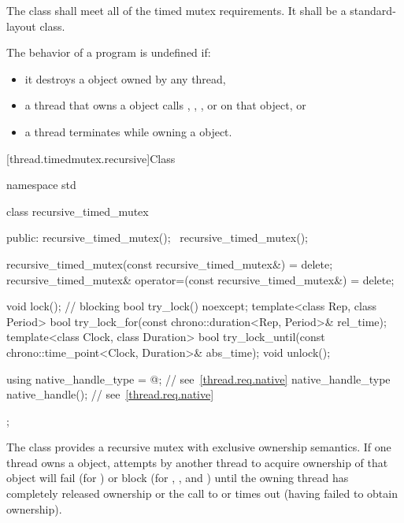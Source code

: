 \pnum
The class  shall meet all of the timed mutex
requirements. It shall be a standard-layout
class.

\pnum
The behavior of a program is undefined if:

\begin{itemize}
\item it destroys a  object owned by any thread,
\item a thread that owns a  object calls ,
, , or  on that object, or
\item a thread terminates while owning a  object.
\end{itemize}

[thread.timedmutex.recursive]{Class }

%
\begin{codeblock}
namespace std {
  class recursive_timed_mutex {
  public:
    recursive_timed_mutex();
    ~recursive_timed_mutex();

    recursive_timed_mutex(const recursive_timed_mutex&) = delete;
    recursive_timed_mutex& operator=(const recursive_timed_mutex&) = delete;

    void lock();    // blocking
    bool try_lock() noexcept;
    template<class Rep, class Period>
      bool try_lock_for(const chrono::duration<Rep, Period>& rel_time);
    template<class Clock, class Duration>
      bool try_lock_until(const chrono::time_point<Clock, Duration>& abs_time);
    void unlock();

    using native_handle_type = @\impdefnc@;          // see~\ref{thread.req.native}
    native_handle_type native_handle();                         // see~\ref{thread.req.native}
  };
}
\end{codeblock}

\pnum
The class  provides a recursive mutex with exclusive
ownership semantics. If one thread owns a  object,
attempts by another thread to acquire ownership of that object will fail (for
) or block (for , , and
) until the owning thread has completely released
ownership or the call to  or 
times out (having failed to obtain ownership).

